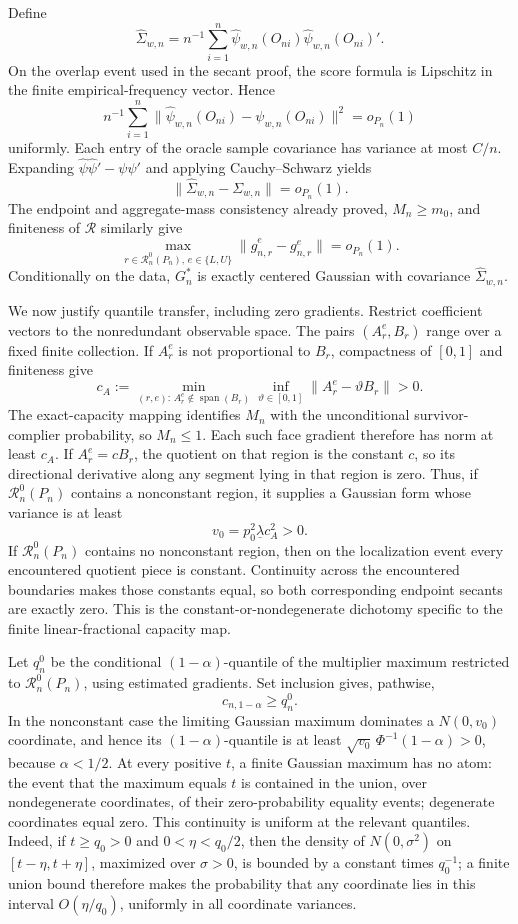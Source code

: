 Define
\[
 \widehat\Sigma_{w,n}=n^{-1}\sum_{i=1}^n
 \widehat\psi_{w,n}(O_{ni})\widehat\psi_{w,n}(O_{ni})'.
\]
On the overlap event used in the secant proof, the score formula is Lipschitz in the finite empirical-frequency vector. Hence
\[
 n^{-1}\sum_{i=1}^n
 \lVert\widehat\psi_{w,n}(O_{ni})-\psi_{w,n}(O_{ni})\rVert^2
 =o_{P_n}(1)
\]
uniformly. Each entry of the oracle sample covariance has variance at most \(C/n\). Expanding
\(\widehat\psi\widehat\psi'-\psi\psi'\) and applying Cauchy--Schwarz yields
\[
 \lVert\widehat\Sigma_{w,n}-\Sigma_{w,n}\rVert=o_{P_n}(1).
\]
The endpoint and aggregate-mass consistency already proved, \(M_n\ge m_0\), and finiteness of \(\mathcal R\) similarly give
\[
 \max_{r\in\mathcal R_n^0(P_n),\,e\in\{L,U\}}
 \lVert\widehat g^e_{n,r}-g^e_{n,r}\rVert=o_{P_n}(1).
\]
Conditionally on the data, \(G_n^*\) is exactly centered Gaussian with covariance \(\widehat\Sigma_{w,n}\).

We now justify quantile transfer, including zero gradients. Restrict coefficient vectors to the nonredundant observable space. The pairs \((A_r^e,B_r)\) range over a fixed finite collection. If \(A_r^e\) is not proportional to \(B_r\), compactness of \([0,1]\) and finiteness give
\[
 c_A:=\min_{(r,e):\,A_r^e\notin\operatorname{span}(B_r)}
       \inf_{\vartheta\in[0,1]}\lVert A_r^e-\vartheta B_r\rVert>0.
\]
The exact-capacity mapping identifies \(M_n\) with the unconditional survivor-complier probability, so \(M_n\le1\). Each such face gradient therefore has norm at least \(c_A\). If \(A_r^e=cB_r\), the quotient on that region is the constant \(c\), so its directional derivative along any segment lying in that region is zero. Thus, if \(\mathcal R_n^0(P_n)\) contains a nonconstant region, it supplies a Gaussian form whose variance is at least
\[
 v_0=p_0^2\underline\lambda c_A^2>0.
\]
If \(\mathcal R_n^0(P_n)\) contains no nonconstant region, then on the localization event every encountered quotient piece is constant. Continuity across the encountered boundaries makes those constants equal, so both corresponding endpoint secants are exactly zero. This is the constant-or-nondegenerate dichotomy specific to the finite linear-fractional capacity map.

Let \(q_n^0\) be the conditional \((1-\alpha)\)-quantile of the multiplier maximum restricted to \(\mathcal R_n^0(P_n)\), using estimated gradients. Set inclusion gives, pathwise,
\[
 c_{n,1-\alpha}\ge q_n^0.
\]
In the nonconstant case the limiting Gaussian maximum dominates a \(N(0,v_0)\) coordinate, and hence its \((1-\alpha)\)-quantile is at least
\(\sqrt{v_0}\,\Phi^{-1}(1-\alpha)>0\), because \(\alpha<1/2\). At every positive \(t\), a finite Gaussian maximum has no atom: the event that the maximum equals \(t\) is contained in the union, over nondegenerate coordinates, of their zero-probability equality events; degenerate coordinates equal zero. This continuity is uniform at the relevant quantiles. Indeed, if \(t\ge q_0>0\) and \(0<\eta<q_0/2\), then the density of \(N(0,\sigma^2)\) on \([t-\eta,t+\eta]\), maximized over \(\sigma>0\), is bounded by a constant times \(q_0^{-1}\); a finite union bound therefore makes the probability that any coordinate lies in this interval \(O(\eta/q_0)\), uniformly in all coordinate variances.

